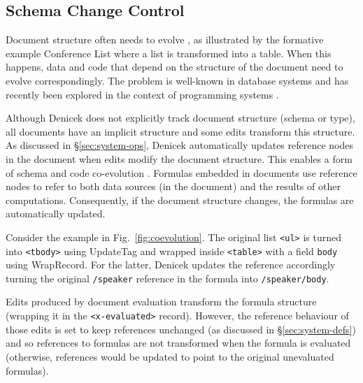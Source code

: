 \documentclass[sigconf,anonymous,screen]{acmart}
\newcommand{\ident}[1]{{\sffamily #1}}
\begin{document}

\subsection{Schema Change Control}
\label{sec:impl-schema}

Document structure often needs to evolve \cite{burnett-2014-silos}, as illustrated by the formative
example Conference List where a list is transformed into a table. When this happens,
data and code that depend on the structure of the document need to evolve correspondingly.
The problem is well-known in database systems \cite{rahm-2006-schema} and has recently been
explored in the context of programming systems \cite{edwards-2025-schema}.

Although Denicek does not explicitly track document structure (schema or type), all documents
have an implicit structure and some edits transform this structure. As
discussed in \S\ref{sec:system-ops}, Denicek automatically updates reference nodes in the
document when edits modify the document structure. This enables a form of schema and code
co-evolution \cite{edwards-2025-schema}. Formulas embedded in documents use reference
nodes to refer to both data sources (in the document) and the results of other computations.
Consequently, if the document structure changes, the formulas are automatically updated.

Consider the example in Fig.~\ref{fig:coevolution}. The original list {\small\Verb_<ul>_} is
turned into {\small\Verb_<tbody>_} using \ident{UpdateTag} and wrapped inside {\small\Verb_<table>_}
with a field {\small\Verb_body_} using \ident{WrapRecord}. For the latter, Denicek updates the
reference accordingly turning the original {\small\Verb_/speaker_} reference in the formula
into {\small\Verb_/speaker/body_}.

Edits produced by document evaluation transform the formula structure (wrapping it in the
{\small\Verb_<x-evaluated>_} record). However, the reference behaviour of those edits is set
to keep references unchanged (as discussed in \S\ref{sec:system-defs}) and so references to
formulas are not transformed when the formula is evaluated (otherwise, references
would be updated to point to the original unevaluated formulas).

\end{document}
